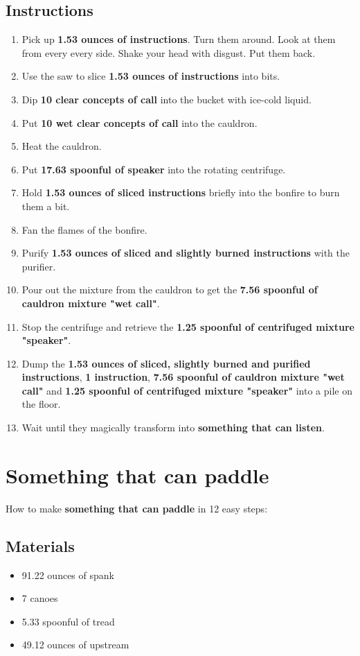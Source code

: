 \documentclass{article}
\begin{document}
\subsection{Instructions}\begin{enumerate}
\item 
Pick up \textbf{1.53 ounces of instructions}. Turn them around. Look at them from every every side. Shake your head with disgust. Put them back.
\item 
Use the saw to slice \textbf{1.53 ounces of instructions} into bits.
\item 
Dip \textbf{10 clear concepts of call} into the bucket with ice-cold liquid.
\item 
Put \textbf{10 wet clear concepts of call} into the cauldron.
\item 
Heat the cauldron.
\item 
Put \textbf{17.63 spoonful of speaker} into the rotating centrifuge.
\item 
Hold \textbf{1.53 ounces of sliced instructions} briefly into the bonfire to burn them a bit.
\item 
Fan the flames of the bonfire.
\item 
Purify \textbf{1.53 ounces of sliced and slightly burned instructions} with the purifier.
\item 
Pour out the mixture from the cauldron to get the \textbf{7.56 spoonful of cauldron mixture "wet call"}.
\item 
Stop the centrifuge and retrieve the \textbf{1.25 spoonful of centrifuged mixture "speaker"}.
\item 
Dump the \textbf{1.53 ounces of sliced, slightly burned and purified instructions}, \textbf{1 instruction}, \textbf{7.56 spoonful of cauldron mixture "wet call"} and \textbf{1.25 spoonful of centrifuged mixture "speaker"} into a pile on the floor.
\item 
Wait until they magically transform into \textbf{something that can listen}.
\end{enumerate}
\newpage
\section{Something that can paddle}How to make \textbf{something that can paddle} in 12 easy steps:

\subsection{Materials}\begin{itemize}
\item 
91.22 ounces of spank
\item 
7 canoes
\item 
5.33 spoonful of tread
\item 
49.12 ounces of upstream
\end{itemize}
\end{document}
